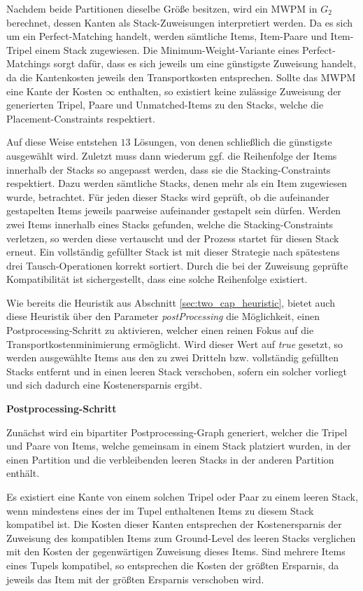 Nachdem beide Partitionen dieselbe Größe besitzen, wird ein \textsc{MWPM} in $G_2$ berechnet, dessen Kanten
als Stack-Zuweisungen interpretiert werden. Da es sich um ein Perfect-Matching handelt, werden sämtliche Items, Item-Paare
und Item-Tripel einem Stack zugewiesen. Die Minimum-Weight-Variante eines Perfect-Matchings sorgt dafür, dass es sich
jeweils um eine günstigste Zuweisung handelt, da die Kantenkosten jeweils den Transportkosten entsprechen.
Sollte das \textsc{MWPM} eine Kante der Kosten $\infty$ enthalten, so existiert keine zulässige Zuweisung
der generierten Tripel, Paare und Unmatched-Items zu den Stacks, welche die Placement-Constraints respektiert.

Auf diese Weise entstehen $13$ Lösungen, von denen schließlich die günstigste ausgewählt wird.
Zuletzt muss dann wiederum ggf. die Reihenfolge der Items innerhalb der Stacks so angepasst werden,
dass sie die Stacking-Constraints respektiert. Dazu werden sämtliche Stacks, denen mehr als
ein Item zugewiesen wurde, betrachtet. Für jeden dieser Stacks wird geprüft, ob die aufeinander
gestapelten Items jeweils paarweise aufeinander gestapelt sein dürfen.
Werden zwei Items innerhalb eines Stacks gefunden, welche die Stacking-Constraints verletzen, so werden diese
vertauscht und der Prozess startet für diesen Stack erneut. Ein vollständig gefüllter Stack ist mit dieser
Strategie nach spätestens drei Tausch-Operationen korrekt sortiert. Durch die bei der Zuweisung geprüfte
Kompatibilität ist sichergestellt, dass eine solche Reihenfolge existiert.

Wie bereits die Heuristik aus Abschnitt \ref{sec:two_cap_heuristic}, bietet auch diese Heuristik über den Parameter
\textit{postProcessing} die Möglichkeit, einen Postprocessing-Schritt zu aktivieren, welcher einen reinen Fokus
auf die Transportkostenminimierung ermöglicht. Wird dieser Wert auf \textit{true} gesetzt, so werden
ausgewählte Items aus den zu zwei Dritteln bzw. vollständig gefüllten Stacks entfernt und in einen leeren
Stack verschoben, sofern ein solcher vorliegt und sich dadurch eine Kostenersparnis ergibt.

\textbf{Postprocessing-Schritt}

Zunächst wird ein bipartiter Postprocessing-Graph generiert, welcher die Tripel und Paare von Items,
welche gemeinsam in einem Stack platziert wurden, in der einen Partition und die verbleibenden leeren
Stacks in der anderen Partition enthält.

Es existiert eine Kante von einem solchen Tripel oder Paar zu einem leeren Stack, wenn mindestens
eines der im Tupel enthaltenen Items zu diesem Stack kompatibel ist. Die Kosten dieser Kanten entsprechen der Kostenersparnis der Zuweisung des kompatiblen Items zum Ground-Level des leeren Stacks verglichen mit den
Kosten der gegenwärtigen Zuweisung dieses Items.
Sind mehrere Items eines Tupels kompatibel, so entsprechen die Kosten der größten Ersparnis, da jeweils
das Item mit der größten Ersparnis verschoben wird.

